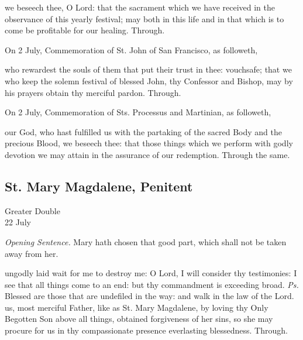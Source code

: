 

\postcommunion
{} we beseech thee, O Lord: that the sacrament which we have received in the observance of this yearly festival; may both in this life and in that which is to come be profitable for our healing. Through.

\begin{rubric}
	 On 2 July, Commemoration of St. John of San Francisco, as followeth,
\end{rubric}
 who rewardest the souls of them that put their trust in thee: vouchsafe; that we who keep the solemn festival of blessed John, thy Confessor and Bishop, may by his prayers obtain thy merciful pardon. Through.

\begin{rubric}
	 On 2 July, Commemoration of Sts. Processus and Martinian, as followeth,
\end{rubric}
 our God, who hast fulfilled us with the partaking of the sacred Body and the precious Blood, we beseech thee: that those things which we perform with godly devotion we may attain in the assurance of our redemption. Through the same.



\subsection{St. Mary Magdalene, Penitent}
\begin{inhead}
    {Greater Double\\
22 July}
\end{inhead}
\par\noindent
\textit{Opening Sentence.} Mary hath chosen that good part, which shall not be taken away from her.

\introit
{} ungodly laid wait for me to destroy me: O Lord, I will consider thy testimonies: I see that all things come to an end: but thy commandment is exceeding broad. \textit{Ps.} Blessed are those that are undefiled in the way: and walk in the law of the Lord.
\collect
 us, most merciful Father, like as St. Mary Magdalene, by loving thy Only Begotten Son above all things, obtained forgiveness of her sins, so she may procure for us in thy compassionate presence everlasting blessedness. Through.

